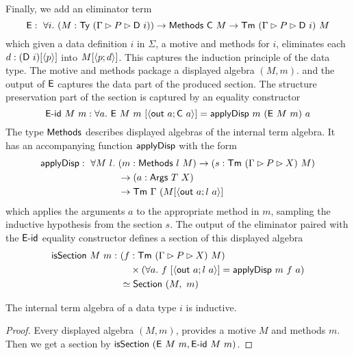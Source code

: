 Finally, we add an eliminator term
\[
	\textsf{E} :\ \forall i.\ (M : \textsf{Ty}\ (\Gamma \rhd P \rhd \textsf{D}\ i)) \to \textsf{Methods}\ \textsf{C}\ M \to \textsf{Tm}\ (\Gamma \rhd P \rhd \textsf{D}\ i)\ M \\
\]
which given a data definition $i$ in $\Sigma$, a motive and methods for $i$,
eliminates each $d : (\textsf{D}\ i)[\langle p\rangle]$ into $M[\langle p;d\rangle]$. This captures the induction
principle of the data type. The motive and methods package a displayed algebra $(M, m)$.
and the output of $\textsf{E}$ captures the data part of the produced section. The
structure preservation part of the section is captured by an equality
constructor
\[
	\mta{E-id}\ M\ m : \forall a.\ \mta{E}\ M\ m\ [\Msub{\mta{out}\ a; \mta{C}\ a}] = \mta{applyDisp}\ m\ (\mta{E}\ M\ m)\ a
\]
The type $\textsf{Methods}$ describes displayed algebras of the internal term algebra.
It has an accompanying function $\textsf{applyDisp}$ with the form
\begin{align*}
    \textsf{applyDisp} :\ \forall M\ l.\ &(m : \textsf{Methods}\ l\ M) \to (s : \textsf{Tm}\ (\Gamma \rhd P \rhd X)\ M) \\
    &\to (a : \textsf{Args}\ T\ X) \\
    &\to \textsf{Tm}\ \Gamma\ (M[\langle\textsf{out}\ a; l\ a\rangle]
\end{align*}
which applies the arguments $a$ to the appropriate method in $m$, sampling the inductive hypothesis
from the section $s$.
The output of the eliminator paired with the $\textsf{E-id}$ equality
constructor defines a section of this displayed algebra
\begin{align*}
    \textsf{isSection}\ M\ m :\ & (f : \textsf{Tm}\ (\Gamma \rhd P \rhd X)\ M) \\
    &\quad\times (\forall a.\ f\ [\langle\textsf{out}\ a;l\ a\rangle] = \textsf{applyDisp}\ m\ f\ a) \\
    &\simeq \textsf{Section}\ (M,\ m)
\end{align*}

\begin{lemma}
	The internal term algebra of a data type $i$ is inductive.
	\begin{proof}
		Every displayed algebra $(M, m)$, provides a motive $M$ and methods $m$. Then we get a section by $\mta{isSection}\ (\mta{E}\ M\ m, \mta{E-id}\ M\ m)$.
	\end{proof}
\end{lemma}


